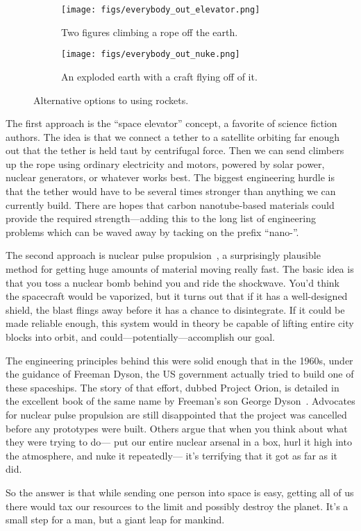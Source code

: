 \begin{figure}[p]
\centering
  \begin{subfigure}[b]{\linewidth}
  \centering
  \texttt{[image: figs/everybody\_out\_elevator.png]}
  \caption{Two figures climbing a rope off the earth.}
  \label{fig:alternatives:elevator}
  \end{subfigure}
  \begin{subfigure}[b]{\linewidth}
  \centering
  \texttt{[image: figs/everybody\_out\_nuke.png]}
  \caption{An exploded earth with a craft flying off of it.}
  \label{fig:alternatives:nuke}
  \end{subfigure}
  \vspace*{1em}
\caption{
    Alternative options to using rockets.
}
\label{fig:alternatives}
\end{figure}

The first approach is the ``space elevator'' concept,
a favorite of science fiction authors.
The idea is that we connect a tether to a satellite orbiting
far enough out that the tether is held taut by centrifugal force.
Then we can send climbers up the rope using ordinary electricity and motors,
powered by solar power, nuclear generators, or whatever works best.
%
The biggest engineering hurdle is that the tether
would have to be several times stronger than anything we can currently build.
There are hopes that carbon nanotube-based materials
could provide the required strength---adding this
to the long list of engineering problems
which can be waved away by tacking on the prefix ``nano-''.

The second approach is nuclear pulse propulsion~\cite{schmidt2000nuclear},
a surprisingly plausible method
for getting huge amounts of material moving really fast.
The basic idea is that you toss a nuclear bomb behind you and ride the shockwave.
%
You'd think the spacecraft would be vaporized,
but it turns out that if it has a well-designed shield,
the blast flings away before it has a chance to disintegrate.
If it could be made reliable enough,
this system would in theory be capable of lifting entire city blocks into orbit,
and could---potentially---accomplish our goal.

The engineering principles behind this were solid enough that in the 1960s,
under the guidance of Freeman Dyson,
the US government actually tried to build one of these spaceships.
The story of that effort, dubbed Project Orion,
is detailed in the excellent book of the same name
by Freeman's son George Dyson~\cite{Dyson:2002}.
%
Advocates for nuclear pulse propulsion are still disappointed
that the project was cancelled before any prototypes were built.
Others argue that when you think about what they were trying to do---%
put our entire nuclear arsenal in a box,
hurl it high into the atmosphere, and nuke it repeatedly---%
it's terrifying that it got as far as it did.

So the answer is that while sending one person into space is easy,
getting all of us there would tax our resources
to the limit and possibly destroy the planet.
It's a small step for a man, but a giant leap for mankind.
